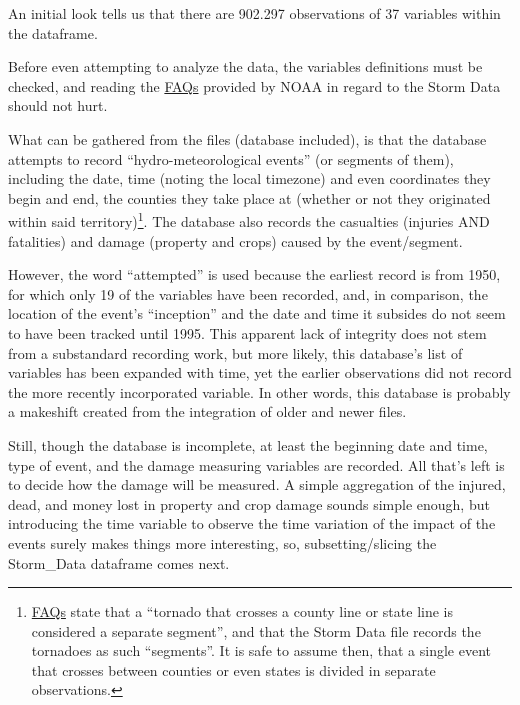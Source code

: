 \documentclass[
]{article}
\begin{document}
An initial look tells us that there are 902.297 observations of 37
variables within the dataframe.

Before even attempting to analyze the data, the variables definitions
must be checked, and reading the
\href{https://d396qusza40orc.cloudfront.net/repdata\%2Fpeer2_doc\%2FNCDC\%20Storm\%20Events-FAQ\%20Page.pdf}{FAQs}
provided by NOAA in regard to the Storm Data should not hurt.

What can be gathered from the files (database included), is that the
database attempts to record ``hydro-meteorological events'' (or segments
of them), including the date, time (noting the local timezone) and even
coordinates they begin and end, the counties they take place at (whether
or not they originated within said territory)\footnote{\href{https://d396qusza40orc.cloudfront.net/repdata\%2Fpeer2_doc\%2FNCDC\%20Storm\%20Events-FAQ\%20Page.pdf}{FAQs}
  state that a ``tornado that crosses a county line or state line is
  considered a separate segment'', and that the Storm Data file records
  the tornadoes as such ``segments''. It is safe to assume then, that a
  single event that crosses between counties or even states is divided
  in separate observations.}. The database also records the casualties
(injuries AND fatalities) and damage (property and crops) caused by the
event/segment.

However, the word ``attempted'' is used because the earliest record is
from 1950, for which only 19 of the variables have been recorded, and,
in comparison, the location of the event's ``inception'' and the date
and time it subsides do not seem to have been tracked until 1995. This
apparent lack of integrity does not stem from a substandard recording
work, but more likely, this database's list of variables has been
expanded with time, yet the earlier observations did not record the more
recently incorporated variable. In other words, this database is
probably a makeshift created from the integration of older and newer
files.

Still, though the database is incomplete, at least the beginning date
and time, type of event, and the damage measuring variables are
recorded. All that's left is to decide how the damage will be measured.
A simple aggregation of the injured, dead, and money lost in property
and crop damage sounds simple enough, but introducing the time variable
to observe the time variation of the impact of the events surely makes
things more interesting, so, subsetting/slicing the Storm\_Data
dataframe comes next.
\end{document}
